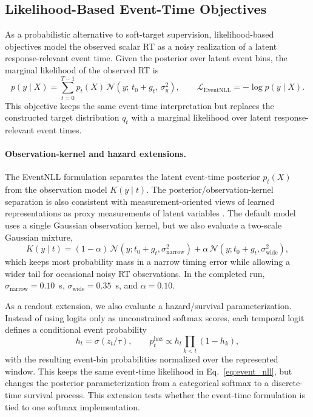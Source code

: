 \documentclass[12pt]{article}
\begin{document}
\subsection{Likelihood-Based Event-Time Objectives}
\label{sec:event_nll}

As a probabilistic alternative to soft-target supervision, likelihood-based objectives model the observed scalar RT as a noisy realization of a latent response-relevant event time. Given the posterior over latent event bins, the marginal likelihood of the observed RT is
\begin{equation}
\label{eq:event_nll}
p(y\mid X)
= \sum_{t=0}^{T-1} p_t(X)\,
\mathcal{N}\!\left(y;\,t_0 + g_t,\,\sigma_y^2\right),
\qquad
\mathcal{L}_{\mathrm{EventNLL}} = -\log p(y\mid X).
\end{equation}
This objective keeps the same event-time interpretation but replaces the constructed target distribution $q_t$ with a marginal likelihood over latent response-relevant event times.

\paragraph{Observation-kernel and hazard extensions.}
The EventNLL formulation separates the latent event-time posterior $p_t(X)$ from the observation model $K(y\mid t)$. The posterior/observation-kernel separation is also consistent with measurement-oriented views of learned representations as proxy measurements of latent variables \citep{Yao2025ThirdPillar}. The default model uses a single Gaussian observation kernel, but we also evaluate a two-scale Gaussian mixture,
\begin{equation}
\label{eq:event_nll_mixture_kernel}
K(y\mid t)=(1-\alpha)\,\mathcal{N}(y;t_0+g_t,\sigma_{\mathrm{narrow}}^2)
+\alpha\,\mathcal{N}(y;t_0+g_t,\sigma_{\mathrm{wide}}^2),
\end{equation}
which keeps most probability mass in a narrow timing error while allowing a wider tail for occasional noisy RT observations. In the completed run, $\sigma_{\mathrm{narrow}}=0.10$~s, $\sigma_{\mathrm{wide}}=0.35$~s, and $\alpha=0.10$.

As a readout extension, we also evaluate a hazard/survival parameterization. Instead of using logits only as unconstrained softmax scores, each temporal logit defines a conditional event probability
\begin{equation}
\label{eq:hazard_readout}
h_t=\sigma(z_t/\tau),\qquad
p_t^{\mathrm{haz}} \propto h_t\prod_{k<t}(1-h_k),
\end{equation}
with the resulting event-bin probabilities normalized over the represented window. This keeps the same event-time likelihood in Eq.~\ref{eq:event_nll}, but changes the posterior parameterization from a categorical softmax to a discrete-time survival process. This extension tests whether the event-time formulation is tied to one softmax implementation.
\end{document}
